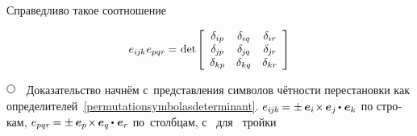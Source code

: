 \begin{otherlanguage}{russian}

Справедливо такое соотношение

\nopagebreak\vspace{-0.1em}\begin{equation}\label{doubleveblen}
e_{i\hspace{-0.1ex}j\hspace{-0.1ex}k} \hspace{.1ex} e_{pqr}
\hspace{-0.1ex} = \hspace{.1ex}
\operatorname{det} \hspace{-0.25ex} \left[
\begin{array}{ccc}
\delta_{ip} & \delta_{iq} & \delta_{ir} \\
\delta_{\hspace{-0.1ex}j\hspace{-0.1ex}p} & \delta_{\hspace{-0.1ex}j\hspace{-0.1ex}q} & \delta_{\hspace{-0.1ex}j\hspace{-0.1ex}r} \\
\delta_{kp} & \delta_{kq} & \delta_{kr}
\end{array}\hspace{-0.1ex}
\right]
\end{equation}

\noindent
${ \tikz[baseline=-1ex] \draw [line width=.5pt, color=black, fill=white] (0, 0) circle (.8ex);
\hspace{.6em} }$
Доказательство
начнём
с~представления
символов чётности перестановки
как определителей~\eqref{permutationsymbolasdeterminant}.
${ e_{i\hspace{-0.1ex}j\hspace{-0.1ex}k} \hspace{-0.2ex}
= \pm \hspace{.4ex}
\bm{e}_i \hspace{-0.36ex} \times \hspace{-0.2ex} \bm{e}_j \hspace{-0.15ex} \dotp \hspace{.1ex} \bm{e}_k }$ по строкам,
${ e_{pqr} \hspace{-0.2ex}
= \pm \hspace{.4ex}
\bm{e}_p \hspace{-0.36ex} \times \hspace{-0.2ex} \bm{e}_q \hspace{-0.15ex} \dotp \hspace{.1ex} \bm{e}_r }$ по~столбцам,
с~\inquotes{$-$} для~ тройки


\end{otherlanguage}
